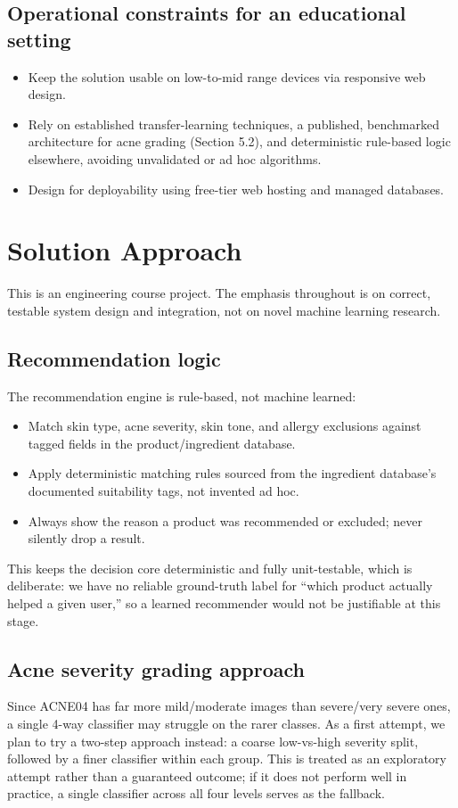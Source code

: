 \documentclass[11pt,a4paper]{article}
\begin{document}
\subsection{Operational constraints for an educational setting}
\begin{itemize}[leftmargin=0.7cm]
    \item Keep the solution usable on low-to-mid range devices via responsive web design.
    \item Rely on established transfer-learning techniques, a published, benchmarked architecture for acne grading (Section 5.2), and deterministic rule-based logic elsewhere, avoiding unvalidated or ad hoc algorithms.
    \item Design for deployability using free-tier web hosting and managed databases.
\end{itemize}

\section{Solution Approach}
This is an engineering course project. The emphasis
throughout is on correct, testable system design and
integration, not on novel machine learning research.

\subsection{Recommendation logic}
The recommendation engine is rule-based, not machine
learned:
\begin{itemize}[leftmargin=0.7cm]
    \item Match skin type, acne severity, skin tone, and allergy exclusions against tagged fields in the product/ingredient database.
    \item Apply deterministic matching rules sourced from the ingredient database's documented suitability tags, not invented ad hoc.
    \item Always show the reason a product was recommended or excluded; never silently drop a result.
\end{itemize}
This keeps the decision core deterministic and fully
unit-testable, which is deliberate: we have no reliable
ground-truth label for ``which product actually helped a
given user,'' so a learned recommender would not be
justifiable at this stage.

\subsection{Acne severity grading approach}
Since ACNE04 has far more mild/moderate images than
severe/very severe ones, a single 4-way classifier may
struggle on the rarer classes. As a first attempt, we
plan to try a two-step approach instead: a coarse
low-vs-high severity split, followed by a finer
classifier within each group. This is treated as an exploratory
attempt rather than a guaranteed outcome; if it does not
perform well in practice, a single classifier across all
four levels serves as the fallback.
\end{document}
